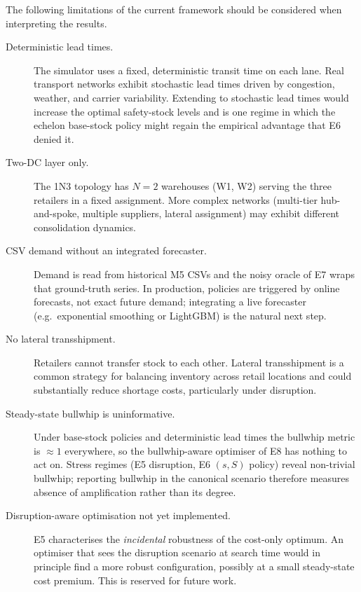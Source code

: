 The following limitations of the current framework should be considered
when interpreting the results.

\begin{description}
  \item[Deterministic lead times.] The simulator uses a fixed,
        deterministic transit time on each lane.  Real transport
        networks exhibit stochastic lead times driven by congestion,
        weather, and carrier variability.  Extending to stochastic
        lead times would increase the optimal safety-stock levels and
        is one regime in which the echelon base-stock policy might
        regain the empirical advantage that E6 denied it.

  \item[Two-DC layer only.] The 1N3 topology has $N=2$ warehouses (W1,
        W2) serving the three retailers in a fixed assignment.  More
        complex networks (multi-tier hub-and-spoke, multiple
        suppliers, lateral assignment) may exhibit different
        consolidation dynamics.

  \item[CSV demand without an integrated forecaster.] Demand is read
        from historical M5 CSVs and the noisy oracle of E7 wraps that
        ground-truth series.  In production, policies are triggered
        by online forecasts, not exact future demand; integrating a
        live forecaster (e.g.\ exponential smoothing or LightGBM)
        is the natural next step.

  \item[No lateral transshipment.] Retailers cannot transfer stock to
        each other.  Lateral transshipment is a common strategy for
        balancing inventory across retail locations and could
        substantially reduce shortage costs, particularly under
        disruption.

  \item[Steady-state bullwhip is uninformative.] Under base-stock
        policies and deterministic lead times the bullwhip metric is
        $\approx 1$ everywhere, so the bullwhip-aware optimiser of E8
        has nothing to act on.  Stress regimes (E5 disruption, E6
        $(s,S)$ policy) reveal non-trivial bullwhip; reporting
        bullwhip in the canonical scenario therefore measures absence
        of amplification rather than its degree.

  \item[Disruption-aware optimisation not yet implemented.] E5
        characterises the \emph{incidental} robustness of the
        cost-only optimum.  An optimiser that sees the disruption
        scenario at search time would in principle find a more robust
        configuration, possibly at a small steady-state cost premium.
        This is reserved for future work.


\end{description}
